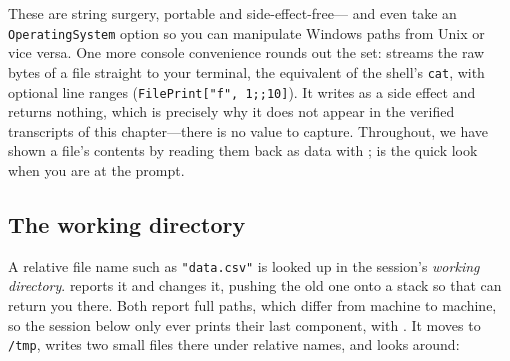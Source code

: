These are string surgery, portable and side-effect-free--- and
 even take an \texttt{OperatingSystem} option so you can
manipulate Windows paths from Unix or vice versa. One
more console convenience rounds out the set:  streams the raw bytes
of a file straight to your terminal, the equivalent of the shell's
\texttt{cat}, with optional line ranges (\texttt{FilePrint["f", 1;;10]}). It
writes as a side effect and returns nothing, which is precisely why it does not
appear in the verified transcripts of this chapter---there is no value to
capture. Throughout, we have shown a file's contents by reading them back as data
with ;  is the quick look when you are at the prompt.

\subsection{The working directory}

A relative file name such as \texttt{"data.csv"} is looked up in the session's
\emph{working directory}.  reports it and
 changes it, pushing the old one
onto a stack so that  can return you
there. Both report full paths, which differ from machine to machine, so the
session below only ever prints their last component, with
. It moves to \texttt{/tmp}, writes two
small files there under relative names, and looks around:

\begin{codepairs}
\end{codepairs}

